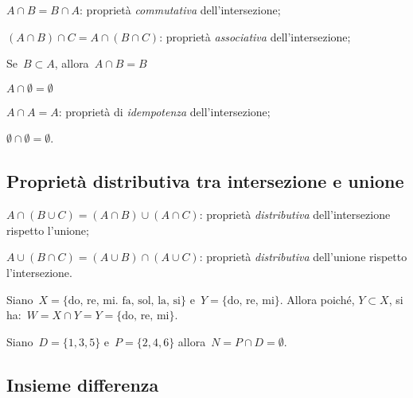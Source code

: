 \begin{enumeratea}
\item \(A\cap B=B\cap A\): proprietà \emph{commutativa} dell'intersezione;
\item \((A\cap B)\cap C=A\cap (B\cap C)\): proprietà \emph{associativa} 
dell'intersezione;
\item Se~\(B\subset A\), allora~\(A\cap B=B\)
\item \(A\cap \emptyset =\emptyset\)
\item \(A\cap A=A\): proprietà di \emph{idempotenza} dell'intersezione;
\item \(\emptyset \cap \emptyset =\emptyset\).
\end{enumeratea}

\subsection[Proprietà distributiva]
{Proprietà distributiva tra intersezione e unione}

\begin{enumeratea}
\item \(A\cap (B\cup C)=(A\cap B)\cup (A\cap C)\): 
proprietà \emph{distributiva} dell'intersezione rispetto l'unione;
\item \(A\cup (B\cap C)=(A\cup B)\cap (A\cup C)\): 
proprietà \emph{distributiva} dell'unione rispetto l'intersezione.
\end{enumeratea}

\begin{exrig}
 \begin{esempio}
Siano~\(X=\{\text{do, re, mi. fa, sol, la, si}\}\)
e~\(Y=\{\text{do, re, mi}\}\). Allora poiché, 
\(Y\subset X\), si ha:~\(W=X\cap Y=Y=\{\text{do, re, mi}\}\).
 \end{esempio}

 \begin{esempio}
Siano~\(D=\{1,3,5\}\) e~\(P=\{2,4,6\}\) allora~\(N=P\cap D=\emptyset\).
\begin{center}
 
\end{center}
 \end{esempio}
\end{exrig}


\subsection{Insieme differenza}
\label{subsec:op_differenza}


